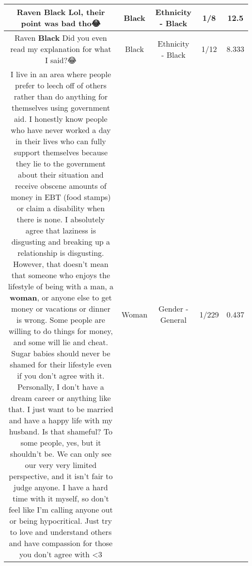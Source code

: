 \documentclass[11pt]{article}
\newlength\mylength
\begin{document}
\begin{center}
\begin{longtable}{|C{.65\mylength}|C{.30\mylength}|C{.12\mylength}|C{.12\mylength}|C{.12\mylength}|}
  \small Raven \textbf{Black} Lol, their point was bad tho😂\normalsize   & Black & Ethnicity - Black & 1/8 & 12.5 \\  \hline
  \small Raven \textbf{Black} Did you even read my explanation for what I said?😂\normalsize   & Black & Ethnicity - Black & 1/12 & 8.333 \\  \hline
  \small I live in an area where people prefer to leech off of others rather than do anything for themselves using government aid. I honestly know people who have never worked a day in their lives who can fully support themselves because they lie to the government about their situation and receive obscene amounts of money in EBT (food stamps) or claim a disability when there is none. I absolutely agree that laziness is disgusting and breaking up a relationship is disgusting. However, that doesn't mean that someone who enjoys the lifestyle of being with a man, a \textbf{woman}, or anyone else to get money or vacations or dinner is wrong. Some people are willing to do things for money, and some will lie and cheat. Sugar babies should never be shamed for their lifestyle even if you don't agree with it. Personally, I don't have a dream career or anything like that. I just want to be married and have a happy life with my husband. Is that shameful? To some people, yes, but it shouldn't be. We can only see our very very limited perspective, and it isn't fair to judge anyone. I have a hard time with it myself, so don't feel like I'm calling anyone out or being hypocritical. Just try to love and understand others and have compassion for those you don't agree with <3\normalsize   & Woman & Gender - General & 1/229 & 0.437 \\  \hline

\end{longtable}
\end{center}
\end{document}
